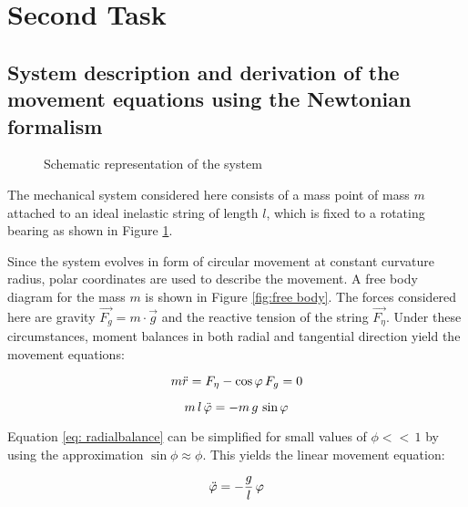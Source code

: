 \documentclass[12pt,bibstyle=none,pagenumberinfooter]{ifmdocument}
\begin{document}
\section{Second Task}

\subsection{System description and derivation of the movement equations using the Newtonian formalism}
\label{sec: NewtonianDerivation}


\begin{figure}[h]
    \centering
    \def\svgwidth{0.4\textwidth}
    
    \caption{Schematic representation of the system}
    \label{fig:skizze}
\end{figure}



The mechanical system considered here consists of a mass point of mass $m$ attached to an ideal inelastic string of length $l$, which is fixed to a rotating bearing as shown in Figure \ref{fig:skizze}.


Since the system evolves in form of circular movement at constant curvature radius, polar coordinates are used to describe the movement. A free body diagram for the mass $m$ is shown in Figure \ref{fig:free body}. The forces considered here are gravity $\Vec{F_g} = m\cdot \Vec{g}$ and the reactive tension of the string $\Vec{F_{\eta}}$. Under these circumstances, moment balances in both radial and tangential direction yield the movement equations:

\begin{equation}

\label{eq: radialbalance}
    m \Ddot{r} = F_{\eta} - \cos{\phi}\,F_g = 0

\end{equation}

\begin{equation}
    \label{eq: tangentialbalance}
    m\, l \, \Ddot{\phi} = -m\, g \,\sin{\phi}
\end{equation}

Equation \ref{eq: radialbalance} can be simplified for small values of $\phi <<\, 1$ by using the approximation $\sin{\phi} \approx \phi $. This yields the linear movement equation:

\begin{equation}
    \Ddot{\phi} = -\frac{g}{l}\,\phi
\end{equation}
\end{document}
